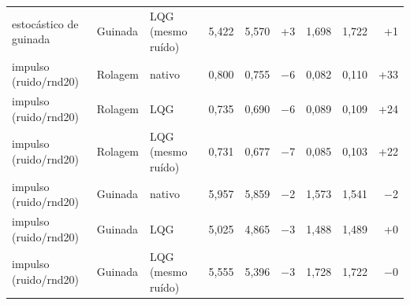 \begin{tabular}{lllrrrrrr}
estocástico de guinada & Guinada & LQG (mesmo ruído) & 5,422 & 5,570 & +3 & 1,698 & 1,722 & +1 \\
\addlinespace
impulso (ruido/rnd20) & Rolagem & nativo & 0,800 & 0,755 & $-$6 & 0,082 & 0,110 & +33 \\
impulso (ruido/rnd20) & Rolagem & LQG & 0,735 & 0,690 & $-$6 & 0,089 & 0,109 & +24 \\
impulso (ruido/rnd20) & Rolagem & LQG (mesmo ruído) & 0,731 & 0,677 & $-$7 & 0,085 & 0,103 & +22 \\
\addlinespace
impulso (ruido/rnd20) & Guinada & nativo & 5,957 & 5,859 & $-$2 & 1,573 & 1,541 & $-$2 \\
impulso (ruido/rnd20) & Guinada & LQG & 5,025 & 4,865 & $-$3 & 1,488 & 1,489 & +0 \\
impulso (ruido/rnd20) & Guinada & LQG (mesmo ruído) & 5,555 & 5,396 & $-$3 & 1,728 & 1,722 & $-$0 \\
\bottomrule
\end{tabular}

